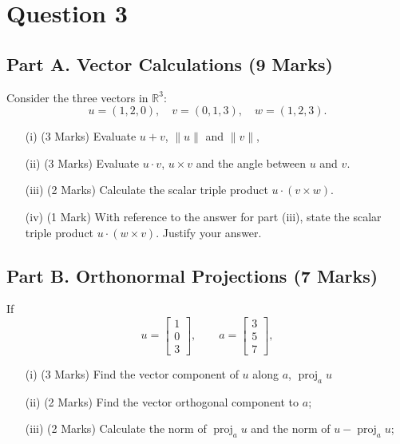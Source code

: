 \documentclass[a4paper,12pt]{article}
\begin{document}
\section*{Question 3}
\subsection*{Part A. Vector Calculations (9 Marks)}
Consider the three vectors in $\mathbb{R}^3$:
$$
u = (1, 2, 0), \quad v = (0, 1, 3),\quad w = (1, 2, 3).
$$
\begin{itemize}
	\item[(i)] (3 Marks) Evaluate $u+v$, $\|u\|$ and $\|v\|$,
	\smallskip \item[(ii)] (3 Marks) Evaluate $u\cdot v$, $u\times v$ and the angle between $u$ and $v$. %
	
	\smallskip\item[(iii)] (2 Marks) Calculate the scalar triple product  $u\cdot(v \times w)$.%
	\smallskip\item[(iv)] (1 Mark) With reference to the answer for part (iii), state the scalar triple product  $u\cdot(w \times v)$. Justify your answer. %
\end{itemize}
\smallskip
\subsection*{Part B. Orthonormal Projections (7 Marks)}
%	
If
\begin{equation*}
u =\left[ \begin{array}{c} 1 \\ 0 \\ 3 \end{array}\right],\qquad 
a =\left[ \begin{array}{c} 3 \\ 5 \\ 7 \end{array}\right],
\end{equation*}

\begin{itemize}
	\item[(i)](3 Marks) Find the vector component of $u$ along $a$, $\operatorname{proj}_{a}u$ 
	\item[(ii)](2 Marks) Find the
	vector orthogonal component to $a$;
	
	\item[(iii)](2 Marks) Calculate the norm of $\operatorname{proj}_a u$ and the norm of $u-\operatorname{proj}_a u$;
	
\end{itemize}
	\smallskip
\end{document}
